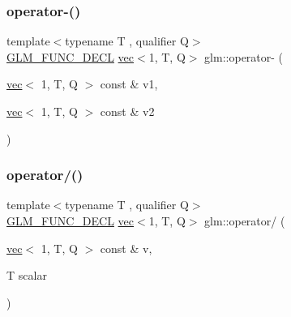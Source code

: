 \subsubsection{\texorpdfstring{operator-\/()}{operator-()}\hspace{0.1cm}{\footnotesize\ttfamily [4/4]}}
{\footnotesize\ttfamily template$<$typename T , qualifier Q$>$ \\
\hyperlink{setup_8hpp_ab2d052de21a70539923e9bcbf6e83a51}{G\+L\+M\+\_\+\+F\+U\+N\+C\+\_\+\+D\+E\+CL} \hyperlink{structglm_1_1vec}{vec}$<$1, T, Q$>$ glm\+::operator-\/ (\begin{DoxyParamCaption}\item[{\hyperlink{structglm_1_1vec}{vec}$<$ 1, T, Q $>$ const \&}]{v1,  }\item[{\hyperlink{structglm_1_1vec}{vec}$<$ 1, T, Q $>$ const \&}]{v2 }\end{DoxyParamCaption})}

\mbox{\label{group__ext__vec1_ga5f0627715e89fde4a13b5655961df660}} 
\subsubsection{\texorpdfstring{operator/()}{operator/()}\hspace{0.1cm}{\footnotesize\ttfamily [1/3]}}
{\footnotesize\ttfamily template$<$typename T , qualifier Q$>$ \\
\hyperlink{setup_8hpp_ab2d052de21a70539923e9bcbf6e83a51}{G\+L\+M\+\_\+\+F\+U\+N\+C\+\_\+\+D\+E\+CL} \hyperlink{structglm_1_1vec}{vec}$<$1, T, Q$>$ glm\+::operator/ (\begin{DoxyParamCaption}\item[{\hyperlink{structglm_1_1vec}{vec}$<$ 1, T, Q $>$ const \&}]{v,  }\item[{T}]{scalar }\end{DoxyParamCaption})}

\mbox{\label{group__ext__vec1_ga851316b0b0cb8d83400d192036a1b128}} 
